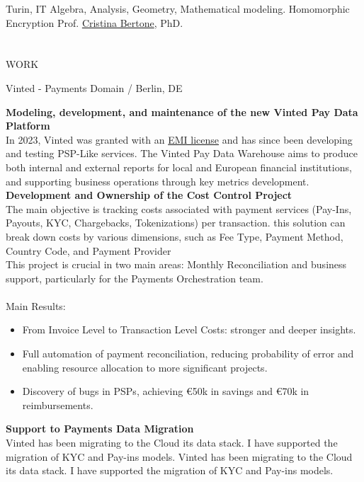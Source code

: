 \documentclass{my_cv}
\begin{document}
\begin{multicols}{2}
{Turin, IT } %
{Algebra, Analysis, Geometry, Mathematical modeling.} %
{Homomorphic Encryption}%
{Prof. \href{https://sites.google.com/view/cristinabertone/home}{Cristina Bertone}, PhD.}%


\columnbreak

\section{\faPencil}{WORK}

%
    {Vinted - Payments Domain / Berlin, DE}%
    {\textbf{Modeling, development, and maintenance of the new Vinted Pay Data Platform}\\
    In 2023, Vinted was granted with an \href{https://www.lb.lt/en/news/electronic-money-institution-licence-granted-to-a-subsidiary-of-vinted}{EMI license} and has since been developing and testing PSP-Like services. The Vinted Pay Data Warehouse aims to produce both internal and external reports for local and European financial institutions, and supporting business operations through key metrics development.\\
    \textbf{Development and Ownership of the Cost Control Project}\\
    The main objective is tracking costs associated with payment services (Pay-Ins, Payouts, KYC, Chargebacks, Tokenizations) per transaction. this solution can break down costs by various dimensions, such as Fee Type, Payment Method, Country Code, and Payment Provider\\
    This project is crucial in two main areas: Monthly Reconciliation and business support, particularly for the Payments Orchestration team. \\ \\
    Main Results:
    \begin{itemize}
      \item   From Invoice Level to Transaction Level Costs: stronger and deeper insights.
      \item Full automation of payment reconciliation, reducing probability of error and enabling resource allocation to more significant projects.
      \item Discovery of bugs in PSPs, achieving €50k in savings and €70k in reimbursements.
    \end{itemize}
    \textbf{Support to Payments Data Migration} \\
    Vinted has been migrating to the Cloud its data stack. I have supported the migration of KYC and Pay-ins models. Vinted has been migrating to the Cloud its data stack. I have supported the migration of KYC and Pay-ins models.\\}%
    {}%


\end{multicols}
\end{document}
